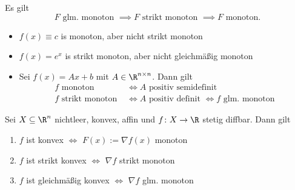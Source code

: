 Es gilt
\[
F \text{ glm. monoton } \implies F \text{ strikt monoton } \implies F \text{ monoton}
.\] 

\begin{beispiel}
\label{thm:beispielmonotonefunktionen2}
	\begin{itemize}
		\item $f(x) \equiv c$ is monoton, aber nicht strikt monoton
		\item $f(x) = e^{x}$ is strikt monoton, aber nicht gleichmäßig monoton
		\item Sei $f(x) = Ax + b$ mit $ A \in \R^{n \times n}$. Dann gilt
			\begin{align*}
				f \text{ monoton } &\iff A \text{ positiv semidefinit} \\
				f \text{ strikt monoton } &\iff A \text{ positiv definit } \iff f \text{ glm. monoton}
			\end{align*}
			
	\end{itemize}
\end{beispiel}

\begin{satz}
\label{thm:monotonefunktionenäquivalenzen}
	Sei $X \subseteq \R^{n}$ nichtleer, konvex, affin und $f \colon X \rightarrow \R $ stetig diffbar. Dann gilt
	\begin{enumerate}[label=(\alph{enumi})]
		\item $f$ ist konvex $\iff$ $F(x):= \nabla f(x)$ monoton
		\item $f$ ist strikt konvex $\iff$ $\nabla f$ strikt monoton
		\item $f$ ist gleichmäßig konvex $\iff$ $\nabla f$ glm. monoton
	\end{enumerate}
\end{satz}

